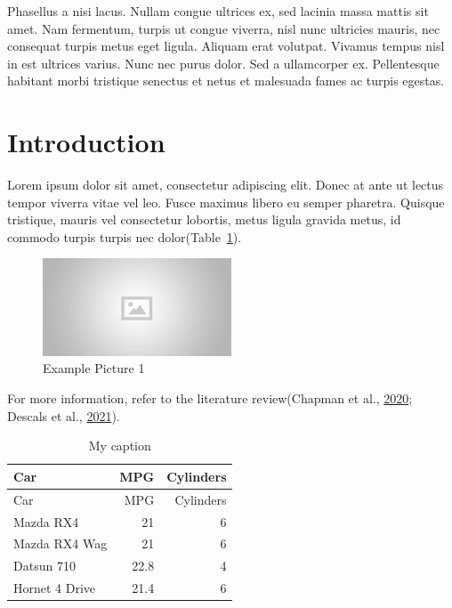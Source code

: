 \documentclass[
]{article}
\begin{document}
Phasellus a nisi lacus. Nullam congue ultrices ex, sed lacinia massa
mattis sit amet. Nam fermentum, turpis ut congue viverra, nisl nunc
ultricies mauris, nec consequat turpis metus eget ligula. Aliquam erat
volutpat. Vivamus tempus nisl in est ultrices varius. Nunc nec purus
dolor. Sed a ullamcorper ex. Pellentesque habitant morbi tristique
senectus et netus et malesuada fames ac turpis egestas.

\newpage
\tableofcontents
\newpage

\hypertarget{introduction}{%
\section{Introduction}\label{introduction}}

Lorem ipsum dolor sit amet, consectetur adipiscing elit. Donec at ante
ut lectus tempor viverra vitae vel leo. Fusce maximus libero eu semper
pharetra. Quisque tristique, mauris vel consectetur lobortis, metus
ligula gravida metus, id commodo turpis turpis nec
dolor(Table~\ref{tbl-mytable1}).

\begin{figure}

{\centering \includegraphics[width=0.5\textwidth,height=\textheight]{placeholder.jpg}

}

\caption{Example Picture 1}

\end{figure}

For more information, refer to the literature review(Chapman et al.,
\protect\hyperlink{ref-chapmanCompoundingImpactDeforestation2020}{2020};
Descals et al.,
\protect\hyperlink{ref-descalsHighresolutionGlobalMap2021}{2021}).

\hypertarget{tbl-mytable1}{}
\begin{longtable}[]{@{}lrr@{}}
\caption{\label{tbl-mytable1}My caption}\tabularnewline
\toprule\noalign{}
Car & MPG & Cylinders \\
\midrule\noalign{}
\endfirsthead
\toprule\noalign{}
Car & MPG & Cylinders \\
\midrule\noalign{}
\endhead
\bottomrule\noalign{}
\endlastfoot
Mazda RX4 & 21 & 6 \\
Mazda RX4 Wag & 21 & 6 \\
Datsun 710 & 22.8 & 4 \\
Hornet 4 Drive & 21.4 & 6 \\
\end{longtable}
\end{document}
